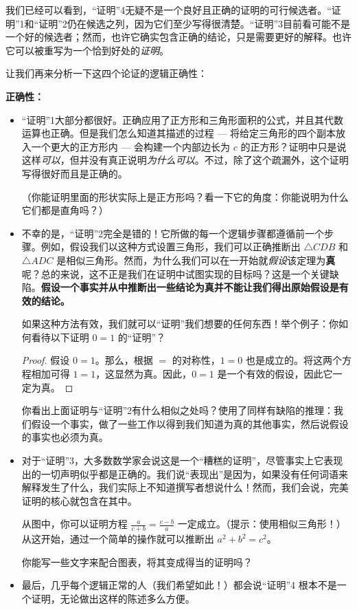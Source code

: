 我们已经可以看到，“证明”4无疑不是一个良好且正确的证明的可行候选者。“证明”1和“证明”2仍在候选之列，因为它们至少写得很清楚。“证明”3目前看可能不是一个好的候选者；然而，也许它确实包含正确的结论，只是需要更好的解释。也许它可以被重写为一个恰到好处的\textit{证明}。

让我们再来分析一下这四个论证的逻辑正确性：

\textbf{正确性：}

\begin{itemize}
    \item “证明”1大部分都很好。正确应用了正方形和三角形面积的公式，并且其代数运算也正确。但是我们怎么知道其描述的过程 --- 将给定三角形的四个副本放入一个更大的正方形内 --- 会构建一个内部边长为 $c$ 的正方形？证明中只是说这样\textit{可以}，但并没有真正说明\textit{为什么可以}。不过，除了这个疏漏外，这个证明写得很好而且是正确的。
    
    （你能证明里面的形状实际上是正方形吗？看一下它的角度：你能说明为什么它们都是直角吗？）
    \item 不幸的是，“证明”2完全是错的！它所做的每一个逻辑步骤都遵循前一个步骤。例如，假设我们以这种方式设置三角形，我们可以正确推断出 $\triangle CDB$ 和 $\triangle ADC$ 是相似三角形。然而，为什么我们可以在一开始就\textit{假设}该定理为\textbf{真}呢？总的来说，这不正是我们在证明中试图实现的目标吗？这是一个关键缺陷。\textbf{假设一个事实并从中推断出一些结论为真并不能让我们得出原始假设是有效的结论。}
    
    如果这种方法有效，我们就可以“证明”我们想要的任何东西！举个例子：你如何看待以下证明 $0 = 1$ 的“证明”？
    \begin{proof}
        假设 $0 = 1$。那么，根据 $=$ 的对称性，$1 = 0$ 也是成立的。将这两个方程相加可得 $1 = 1$，这显然为真。因此，$0 = 1$ 是一个有效的假设，因此它一定为真。
    \end{proof}
    你看出上面证明与“证明”2有什么相似之处吗？使用了同样有缺陷的推理：我们假设一个事实，做了一些工作以得到我们知道为真的其他事实，然后说假设的事实也必须为真。
    \item 对于“证明”3，大多数数学家会说这是一个“糟糕的证明”，尽管事实上它表现出的一切声明似乎都是正确的。我们说“表现出”是因为，如果没有任何词语来解释发生了什么，我们实际上不知道撰写者想说什么！然而，我们会说，完美证明的核心就包含在其中。
    
    从图中，你可以证明方程 $\frac{a}{c+b} = \frac{c-b}{a}$ 一定成立。（提示：使用相似三角形！）从这开始，通过一个简单的操作就可以推断出 $a^2 + b^2 = c^2$。

    你能写一些文字来配合图表，将其变成得当的证明吗？
    \item 最后，几乎每个逻辑正常的人（我们希望如此！）都会说“证明”4 根本不是一个证明，无论做出这样的陈述多么方便。
\end{itemize}

